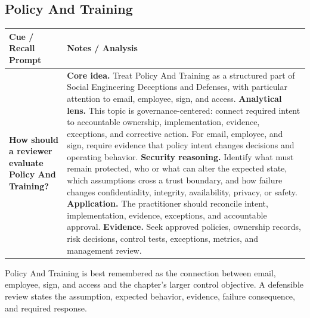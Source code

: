 \documentclass[11pt]{article}
\newcommand{\CornellHeader}{%
\rowcolor{Navy}\color{white}\bfseries Cue / Recall Prompt & \color{white}\bfseries Notes / Analysis\\\hline}
\newcommand{\CornellRow}[2]{%
\cellcolor{CueGray}\RaggedRight\textbf{#1} & \RaggedRight #2\\\hline}
\begin{document}
\subsection*{Policy And Training}
\begin{longtable}{>{\RaggedRight\arraybackslash}p{}|>{\RaggedRight\arraybackslash}p{}}
\CornellHeader
\CornellRow{How should a reviewer evaluate Policy And Training?}{\textbf{Core idea.} Treat Policy And Training as a structured part of Social Engineering Deceptions and Defenses, with particular attention to email, employee, sign, and access. \textbf{Analytical lens.} This topic is governance-centered: connect required intent to accountable ownership, implementation, evidence, exceptions, and corrective action. For email, employee, and sign, require evidence that policy intent changes decisions and operating behavior. \textbf{Security reasoning.} Identify what must remain protected, who or what can alter the expected state, which assumptions cross a trust boundary, and how failure changes confidentiality, integrity, availability, privacy, or safety. \textbf{Application.} The practitioner should reconcile intent, implementation, evidence, exceptions, and accountable approval. \textbf{Evidence.} Seek approved policies, ownership records, risk decisions, control tests, exceptions, metrics, and management review.}
\end{longtable}
\begin{topicsummary}
Policy And Training is best remembered as the connection between email, employee, sign, and access and the chapter's larger control objective. A defensible review states the assumption, expected behavior, evidence, failure consequence, and required response.
\end{topicsummary}
\end{document}
